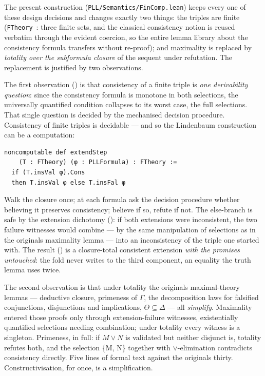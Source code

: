 The present construction (\texttt{PLL/\allowbreak{}Semantics/\allowbreak{}FinComp.lean}) keeps every one of these
design decisions and changes exactly two things: the triples are finite
(\texttt{FTheory}~: three finite sets, and the classical consistency notion is
reused verbatim through the evident coercion, so the entire lemma
library about the consistency formula transfers without re-proof); and
maximality is replaced by \emph{totality over the subformula closure} of the
sequent under refutation. The replacement is justified by two
observations.

The first observation () is that consistency of a
finite triple is \emph{one derivability question}: since the consistency
formula is monotone in both selections, the universally quantified
condition collapses to its worst case, the full selections. That single
question is decided by the mechanised decision procedure. Consistency
of finite triples is decidable --- and so the Lindenbaum construction can
be a computation:

\begin{lstlisting}
noncomputable def extendStep
    (T : FTheory) (φ : PLLFormula) : FTheory :=
  if (T.insVal φ).Cons
  then T.insVal φ else T.insFal φ
\end{lstlisting}

Walk the closure once; at each formula ask the decision procedure
whether believing it preserves consistency; believe if so, refute if
not. The else-branch is safe by the extension dichotomy
(): if both extensions were inconsistent, the
two failure witnesses would combine --- by the same manipulation of selections as
in the original\textquotesingle s maximality lemma --- into an inconsistency of the
triple one started with. The result () is a closure-total
consistent extension \emph{with the promises untouched}: the fold never
writes to the third component, an equality the truth lemma uses twice.

The second observation is that under totality the original\textquotesingle s
maximal-theory lemmas --- deductive closure, primeness of \ensuremath{\Gamma}, the
decomposition laws for falsified conjunctions, disjunctions and
implications, \ensuremath{\Theta \subseteq \Delta} --- all \emph{simplify}. Maximality entered those proofs
only through extension-failure witnesses, existentially quantified
selections needing combination; under totality every witness is a
singleton. Primeness, in full: if \ensuremath{M \vee N} is validated but neither
disjunct is, totality refutes both, and the selection \{M, N\} together
with \ensuremath{\vee}-elimination contradicts consistency directly. Five lines of
formal text against the original\textquotesingle s thirty. Constructivisation, for
once, is a simplification.

